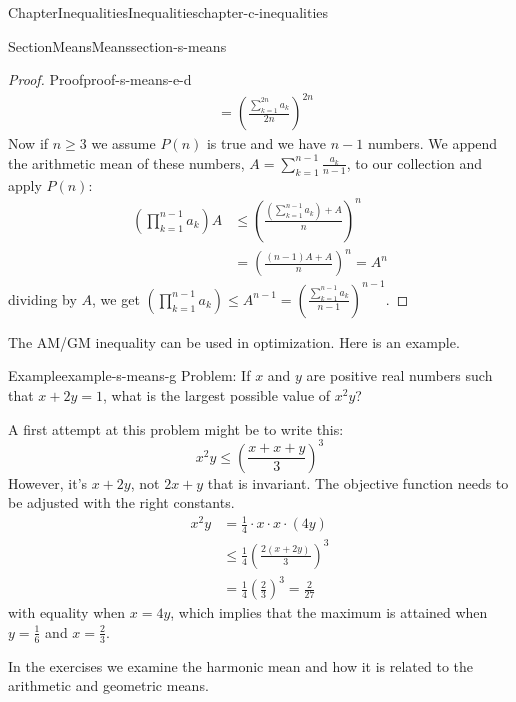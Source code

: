 \documentclass[oneside,10pt,]{book}
\numberwithin{equation}{section}
\begin{document}
\begin{chapterptx}{Chapter}{Inequalities}{}{Inequalities}{}{}{chapter-c-inequalities}
\begin{sectionptx}{Section}{Means}{}{Means}{}{}{section-s-means}
\begin{proof}{Proof}{}{proof-s-means-e-d}
\begin{equation*}
\begin{split}
& = \left(\frac{\sum_{k=1}^{2n} a_k}{2n}\right)^{2n} 
\end{split}
\end{equation*}
Now if \(n \ge 3\) we assume \(P(n)\) is true and we have \(n-1\) numbers. We append the arithmetic mean of these numbers, \(A = \sum_{k=1}^{n-1} \frac{a_k}{n-1}\), to our collection and apply \(P(n)\):%
\begin{equation*}
\begin{split}
\left(\prod_{k=1}^{n-1} a_k\right)A & \leq \left(\frac{\left(\sum_{k=1}^{n-1} a_k\right) + A}{n}\right)^n\\
& = \left( \frac{(n-1)A + A}{n} \right)^n = A^n
\end{split}
\end{equation*}
dividing by \(A\), we get \(\left(\prod_{k=1}^{n-1} a_k\right) \leq A^{n-1} = \left(\frac{\sum_{k=1}^{n-1} a_{k}}{n-1}\right)^{n-1}\).%
\end{proof}
The AM\slash{}GM inequality can be used in optimization.  Here is an example.%
\begin{example}{Example}{}{example-s-means-g}%
Problem:  If \(x\) and \(y\) are positive real numbers such that \(x+2y=1\), what is the largest possible value of \(x^2 y\)?%
\par
A first attempt at this problem might be to write this:%
\begin{equation*}
x^2 y \leq  \left( \frac{x + x + y}{3} \right)^3
\end{equation*}
However, it's \(x+2y\), not \(2x + y\) that is invariant. The objective function needs to be adjusted with the right constants.%
\begin{equation*}
\begin{split}
x^2 y &= \frac{1}{4} \cdot x\cdot x\cdot (4 y) \\
&\leq  \frac{1}{4} \left( \frac{2(x+2y)}{3} \right)^3\\
& = \frac{1}{4} \left( \frac{2}{3} \right)^3 = \frac{2}{27} 
\end{split}
\end{equation*}
with equality when \(x=4y\), which implies that the maximum is attained when \(y=\frac{1}{6}\) and \(x=\frac{2}{3}\).%
\end{example}
In the exercises we examine the harmonic mean and how it is related to the arithmetic and geometric means.%
\end{sectionptx}
%
%
\typeout{************************************************}
\typeout{************************************************}

\end{chapterptx}
\end{document}
